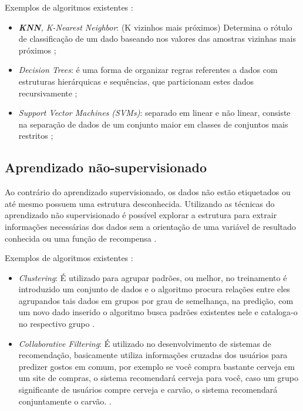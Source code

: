 Exemplos de algoritmos existentes \cite{kirk2014thoughtful}:
\begin{itemize}
    \item \textit{\textbf{KNN}, K-Nearest Neighbor}: (K vizinhos mais próximos) Determina o rótulo de classificação de um dado baseando nos valores das amostras vizinhas mais próximos \cite{kirk2014thoughtful};
    \item \textit{Decision Trees}: é uma forma de organizar regras referentes a dados com estruturas hierárquicas e sequências, que particionam estes dados recursivamente \cite{murthy1998automatic};
    \item \textit{Support Vector Machines (SVMs)}: separado em linear e não linear, consiste na separação de dados de um conjunto maior em classes de conjuntos mais restritos \cite{lorena2007introduccao};
\end{itemize}

\subsection{Aprendizado não-supervisionado}
Ao contrário do aprendizado supervisionado, os dados não estão etiquetados ou até mesmo possuem uma estrutura desconhecida. Utilizando as técnicas do aprendizado não supervisionado é possível explorar a estrutura para extrair informações necessárias dos dados sem a orientação de uma variável de resultado conhecida ou uma função de recompensa \cite{geron2017hands} .

Exemplos de algoritmos existentes \cite{kirk2014thoughtful}:
\begin{itemize}
    \item \textit{Clustering}: É utilizado para agrupar padrões, ou melhor, no treinamento é introduzido um conjunto de dados e o algoritmo procura relações entre eles agrupandos tais dados em grupos por grau de semelhança, na predição, com um novo dado inserido o algoritmo busca padrões existentes nele e cataloga-o no respectivo grupo \cite{kirk2014thoughtful}.   
    \item \textit{Collaborative Filtering}: É utilizado no desenvolvimento de sistemas de recomendação, basicamente utiliza informações cruzadas dos usuários para predizer gostos em comum, por exemplo se você compra bastante cerveja em um site de compras, o sistema recomendará cerveja para você, caso um grupo significante de usuários compre cerveja e carvão, o sistema recomendará conjuntamente o carvão. \cite{kirk2014thoughtful}.  
\end{itemize}

